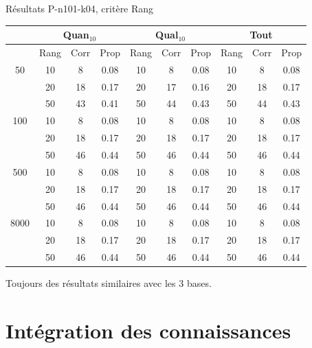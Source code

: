 \documentclass{beamer}
\begin{document}
\begin{frame}{Résultats P-n101-k04, critère Rang}
\begin{table}[H]

\begin{tabular}{|@{}c@{}|@{}c@{}|@{}c@{}|@{}c@{}||@{}c@{}|@{}c@{}|@{}c@{}||@{}c@{}|@{}c@{}|@{}c@{}|}

\hline
 & \multicolumn{3}{c|}{Quan$_{10}$} & \multicolumn{3}{c|}{Qual$_{10}$} & \multicolumn{3}{c|}{Tout} \\
 \hline
 & Rang & Corr & Prop & Rang & Corr & Prop & Rang & Corr & Prop \\
 \hline
 50 & 10  & 8 & 0.08 & 10  & 8 & 0.08 & 10  & 8 & 0.08 \\
 \cline{2-10} 
    & 20 & 18 & 0.17 & 20  & 17 & 0.16 & 20 & 18 & 0.17  \\
 \cline{2-10} 
    & 50 & 43 & 0.41 & 50 & 44 & 0.43 & 50 & 44 & 0.43  \\
  \hline
   100 & 10  & 8 & 0.08 & 10  & 8 & 0.08 & 10  & 8 & 0.08  \\
 \cline{2-10} 
    & 20 & 18 & 0.17 & 20 & 18 & 0.17 & 20 & 18 & 0.17  \\
  \cline{2-10} 
    & 50 & 46 & 0.44 & 50 & 46 & 0.44 & 50 & 46 & 0.44  \\
  \hline
   500 & 10  & 8 & 0.08 & 10  & 8 & 0.08 & 10  & 8 & 0.08  \\
 \cline{2-10} 
    & 20 & 18 & 0.17 & 20 & 18 & 0.17 & 20 & 18 & 0.17  \\
  \cline{2-10} 
    & 50 & 46 & 0.44 & 50 & 46 & 0.44 & 50 & 46 & 0.44  \\
  \hline
   8000 & 10  & 8 & 0.08 & 10  & 8 & 0.08 & 10  & 8 & 0.08  \\
 \cline{2-10} 
    & 20 & 18 & 0.17 & 20 & 18 & 0.17 & 20 & 18 & 0.17  \\
  \cline{2-10} 
    & 50 & 46 & 0.44 & 50 & 46 & 0.44 & 50 & 46 & 0.44  \\
  \hline

\end{tabular}
\end{table}
Toujours des résultats similaires avec les 3 bases.
\end{frame}
\section{Intégration des connaissances}
\end{document}
